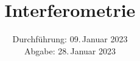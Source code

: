 

\subject{V64}
\title{Interferometrie}
\date{%
  Durchführung: 09.\,Januar 2023
  \\
  Abgabe: 28.\,Januar 2023
}



\maketitle
\thispagestyle{empty}
\tableofcontents
\newpage







\newpage
\printbibliography{}


